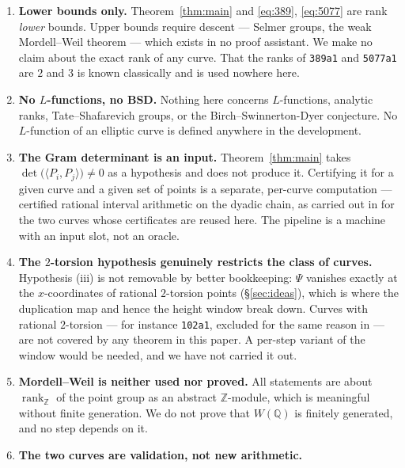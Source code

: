 \documentclass[11pt,reqno]{amsart}
\theoremstyle{plain}
\theoremstyle{definition}
\theoremstyle{remark}
\DeclareMathOperator{\rank}{rank}
\begin{document}
\begin{enumerate}[label=\textup{(\alph*)}]
  \item \textbf{Lower bounds only.} Theorem~\ref{thm:main} and
        \eqref{eq:389}, \eqref{eq:5077} are rank \emph{lower} bounds.
        Upper bounds require descent --- Selmer groups, the weak
        Mordell--Weil theorem --- which exists in no proof assistant. We
        make no claim about the exact rank of any curve. That the ranks
        of \texttt{389a1} and \texttt{5077a1} are $2$ and $3$ is known
        classically \cite{cremona,lmfdb} and is used nowhere here.
  \item \textbf{No $L$-functions, no BSD.} Nothing here concerns
        $L$-functions, analytic ranks, Tate--Shafarevich groups, or the
        Birch--Swinnerton-Dyer conjecture. No $L$-function of an
        elliptic curve is defined anywhere in the development.
  \item \textbf{The Gram determinant is an input.} Theorem~\ref{thm:main}
        takes $\det\bigl(\langle P_i,P_j\rangle\bigr) \ne 0$ as a
        hypothesis and does not produce it. Certifying it for a given
        curve and a given set of points is a separate, per-curve
        computation --- certified rational interval arithmetic on the
        dyadic chain, as carried out in \cite{MW} for the two curves
        whose certificates are reused here. The pipeline is a machine
        with an input slot, not an oracle.
  \item \textbf{The $2$-torsion hypothesis genuinely restricts the
        class of curves.} Hypothesis (iii) is not removable by better
        bookkeeping: $\Psi$ vanishes exactly at the $x$-coordinates of
        rational $2$-torsion points (\S\ref{sec:ideas}), which is where
        the duplication map and hence the height window break down.
        Curves with rational $2$-torsion --- for instance
        \texttt{102a1}, excluded for the same reason in \cite{MW} ---
        are not covered by any theorem in this paper. A per-step
        variant of the window would be needed, and we have not carried
        it out.
  \item \textbf{Mordell--Weil is neither used nor proved.} All
        statements are about $\rank_{\mathbb{Z}}$ of the point group as
        an abstract $\mathbb{Z}$-module, which is meaningful without
        finite generation. We do not prove that $W(\mathbb{Q})$ is
        finitely generated, and no step depends on it.
  \item \textbf{The two curves are validation, not new arithmetic.}

\end{enumerate}
\end{document}
